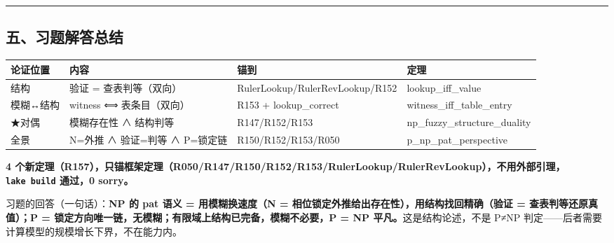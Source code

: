 \documentclass[
]{article}
\newcounter{none} %
\begin{document}
\begin{center}\rule{0.5\linewidth}{0.5pt}\end{center}

\subsection{五、习题解答总结}\label{ux4e94ux4e60ux9898ux89e3ux7b54ux603bux7ed3}

{\def\LTcaptype{none} %
\begin{longtable}[]{@{}
 >{\raggedright\arraybackslash}p{}
 >{\raggedright\arraybackslash}p{}
 >{\raggedright\arraybackslash}p{}
 >{\raggedright\arraybackslash}p{}@{}}
\toprule\noalign{}
\begin{minipage}[b]{\linewidth}\raggedright
论证位置
\end{minipage} & \begin{minipage}[b]{\linewidth}\raggedright
内容
\end{minipage} & \begin{minipage}[b]{\linewidth}\raggedright
锚到
\end{minipage} & \begin{minipage}[b]{\linewidth}\raggedright
定理
\end{minipage} \\
\midrule\noalign{}
\endhead
\bottomrule\noalign{}
\endlastfoot
结构 & 验证 = 查表判等（双向） & RulerLookup/RulerRevLookup/R152 &
lookup\_iff\_value \\
模糊↔结构 & witness ⟺ 表条目（双向） & R153 + lookup\_correct &
witness\_iff\_table\_entry \\
★对偶 & 模糊存在性 ∧ 结构判等 & R147/R152/R153 &
np\_fuzzy\_structure\_duality \\
全景 & N=外推 ∧ 验证=判等 ∧ P=锁定链 & R150/R152/R153/R050 &
p\_np\_pat\_perspective \\
\end{longtable}
}

\textbf{4
个新定理（R157），只锚框架定理（R050/R147/R150/R152/R153/RulerLookup/RulerRevLookup），不用外部引理，\texttt{lake\ build}
通过，0 sorry。}

习题的回答（一句话）：\textbf{NP 的 pat 语义 = 用模糊换速度（N =
相位锁定外推给出存在性），用结构找回精确（验证 = 查表判等还原真值）；P =
锁定方向唯一链，无模糊；有限域上结构已完备，模糊不必要，P = NP
平凡。}这是结构论述，不是 P≠NP
判定------后者需要计算模型的规模增长下界，不在能力内。
\end{document}
